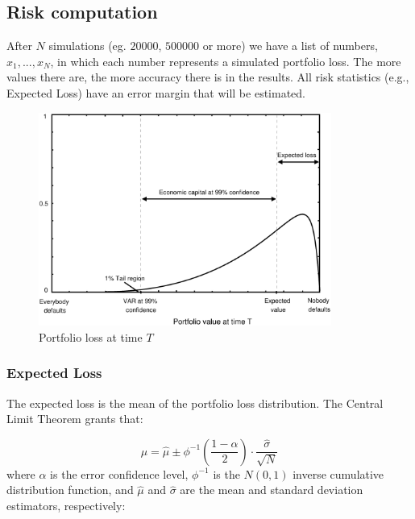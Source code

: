 \documentclass[a4paper,12pt,final]{article}
\begin{document}
\subsection{Risk computation}
After $N$ simulations (eg. $20000$, $500000$ or more) we have a list
of numbers, ${x_1, ..., x_N}$, in which each number represents a simulated portfolio 
loss. The more values there are, the more accuracy there is in the results. All risk 
statistics (e.g., Expected Loss) have an error margin that will be estimated.
\newline

\begin{figure}[!hbt]
\begin{center}
\includegraphics[height=7cm, angle=0]{./images/creditvar.eps}
\caption{Portfolio loss at time $T$}
\label{creditvar}
\end{center}
\end{figure}
\FloatBarrier

\subsubsection{Expected Loss}
The expected loss is the mean of the portfolio loss distribution.
The Central Limit Theorem \cite{stats:schaum} grants that:

\begin{displaymath}
\mu = \widehat{\mu} \pm \phi^{-1}\left(\frac{1-\alpha}{2}\right) \cdot \frac{\widehat{\sigma}}{\sqrt{N}}
\end{displaymath}
where $\alpha$ is the error confidence level, $\phi^{-1}$ is the $N(0,1)$ inverse 
cumulative distribution function, and $\widehat{\mu}$ and $\widehat{\sigma}$ are 
the mean and standard deviation estimators, respectively:
\end{document}
